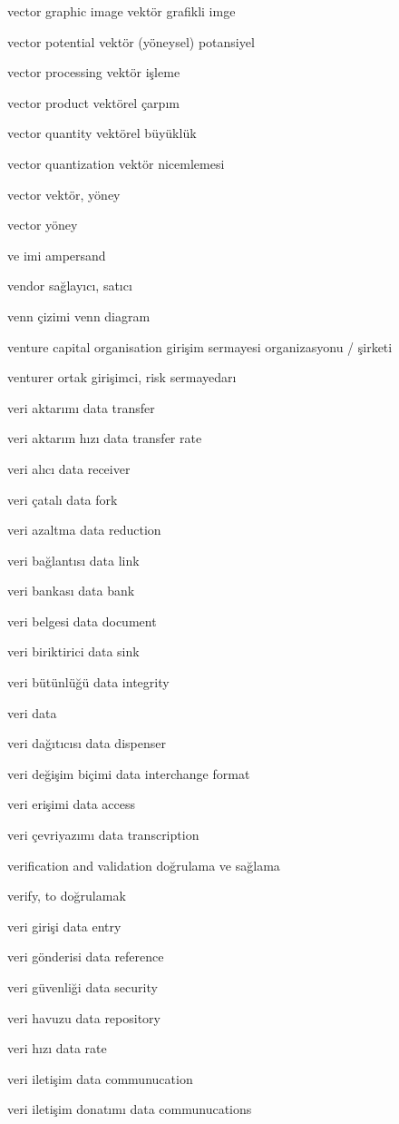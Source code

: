 \documentclass[12pt,fleqn]{article}\usepackage{../../common}
\begin{document}
vector graphic image vektör grafikli imge

vector potential vektör (yöneysel) potansiyel

vector processing vektör işleme

vector product vektörel çarpım

vector quantity vektörel büyüklük

vector quantization vektör nicemlemesi

vector vektör, yöney

vector yöney

ve imi ampersand

vendor sağlayıcı, satıcı

venn çizimi venn diagram

venture capital organisation girişim sermayesi organizasyonu / şirketi

venturer ortak girişimci, risk sermayedarı

veri aktarımı data transfer

veri aktarım hızı data transfer rate

veri alıcı data receiver

veri çatalı data fork

veri azaltma data reduction

veri bağlantısı data link

veri bankası data bank

veri belgesi data document

veri biriktirici data sink

veri bütünlüğü data integrity

veri data

veri dağıtıcısı data dispenser

veri değişim biçimi data interchange format

veri erişimi data access

veri çevriyazımı data transcription

verification and validation doğrulama ve sağlama

verify, to doğrulamak

veri girişi data entry

veri gönderisi data reference

veri güvenliği data security

veri havuzu data repository

veri hızı data rate

veri iletişim data communucation

veri iletişim donatımı data communucations
\end{document}
